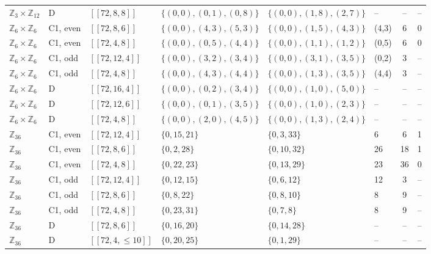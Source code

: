 \documentclass[reprint,twocolumn,superscriptaddress,nofootinbib]{revtex4-2}
\theoremstyle{plain}
\begin{document}
\begin{table}[!t]
\begin{ruledtabular}
\begin{tabular}{llllllcc}
$\mathbb{Z}_{3}\times\mathbb{Z}_{12}$ & D & $[[72,8,8]]$ & $\{(0,0),(0,1),(0,8)\}$ & $\{(0,0),(1,8),(2,7)\}$ & -- & -- & -- \\
$\mathbb{Z}_{6}\times\mathbb{Z}_{6}$ & C1, even & $[[72,8,6]]$ & $\{(0,0),(4,3),(5,3)\}$ & $\{(0,0),(1,5),(4,3)\}$ & (4,3) & 6 & 0 \\
$\mathbb{Z}_{6}\times\mathbb{Z}_{6}$ & C1, even & $[[72,4,8]]$ & $\{(0,0),(0,5),(4,4)\}$ & $\{(0,0),(1,1),(1,2)\}$ & (0,5) & 6 & 0 \\
$\mathbb{Z}_{6}\times\mathbb{Z}_{6}$ & C1, odd & $[[72,12,4]]$ & $\{(0,0),(3,2),(3,4)\}$ & $\{(0,0),(3,1),(3,5)\}$ & (0,2) & 3 & -- \\
$\mathbb{Z}_{6}\times\mathbb{Z}_{6}$ & C1, odd & $[[72,4,8]]$ & $\{(0,0),(4,3),(4,4)\}$ & $\{(0,0),(1,3),(3,5)\}$ & (4,4) & 3 & -- \\
$\mathbb{Z}_{6}\times\mathbb{Z}_{6}$ & D & $[[72,16,4]]$ & $\{(0,0),(0,2),(3,4)\}$ & $\{(0,0),(1,0),(5,0)\}$ & -- & -- & -- \\
$\mathbb{Z}_{6}\times\mathbb{Z}_{6}$ & D & $[[72,12,6]]$ & $\{(0,0),(0,1),(3,5)\}$ & $\{(0,0),(1,0),(2,3)\}$ & -- & -- & -- \\
$\mathbb{Z}_{6}\times\mathbb{Z}_{6}$ & D & $[[72,4,8]]$ & $\{(0,0),(2,0),(4,5)\}$ & $\{(0,0),(1,3),(2,4)\}$ & -- & -- & -- \\
$\mathbb{Z}_{36}$ & C1, even & $[[72,12,4]]$ & $\{0,15,21\}$ & $\{0,3,33\}$ & 6 & 6 & 1 \\
$\mathbb{Z}_{36}$ & C1, even & $[[72,8,6]]$ & $\{0,2,28\}$ & $\{0,10,32\}$ & 26 & 18 & 1 \\
$\mathbb{Z}_{36}$ & C1, even & $[[72,4,8]]$ & $\{0,22,23\}$ & $\{0,13,29\}$ & 23 & 36 & 0 \\
$\mathbb{Z}_{36}$ & C1, odd & $[[72,12,4]]$ & $\{0,12,15\}$ & $\{0,6,12\}$ & 12 & 3 & -- \\
$\mathbb{Z}_{36}$ & C1, odd & $[[72,8,6]]$ & $\{0,8,22\}$ & $\{0,8,10\}$ & 8 & 9 & -- \\
$\mathbb{Z}_{36}$ & C1, odd & $[[72,4,8]]$ & $\{0,23,31\}$ & $\{0,7,8\}$ & 8 & 9 & -- \\
$\mathbb{Z}_{36}$ & D & $[[72,8,6]]$ & $\{0,16,20\}$ & $\{0,14,28\}$ & -- & -- & -- \\
$\mathbb{Z}_{36}$ & D & $[[72,4,\le10]]$ & $\{0,20,25\}$ & $\{0,1,29\}$ & -- & -- & -- \\
\end{tabular}
\end{ruledtabular}
\end{table}
\end{document}
